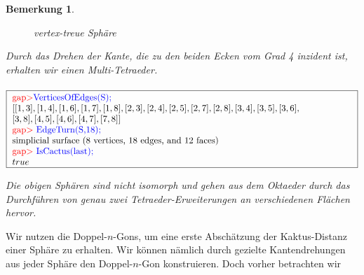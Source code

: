 \documentclass[12pt,titlepage,twoside,cleardoublepage]{article}
\theoremstyle{nummermitklammern}
\newtheorem{bemerkung}[temp]{Bemerkung}
\newtheorem{bemerkung}[zahl]{Bemerkung}
\numberwithin{equation}{section}
\begin{document}
\begin{bemerkung}
\begin{itemize}
\begin{figure}[H]
\begin{center}
\end{center}
\caption{vertex-treue Sphäre}
\end{figure}
Durch das Drehen der Kante, die zu den beiden Ecken vom Grad 4 inzident ist, erhalten wir einen Multi-Tetraeder.\\\\
$\fbox{
\parbox{13.4cm}{
\textcolor{red}{gap$>$}\textcolor{blue}{ VerticesOfEdges(S);}\newline
$[ [ 1, 3 ], [ 1, 4 ], [ 1, 6 ], [ 1, 7 ], [ 1, 8 ], [ 2, 3 ], [ 2, 4 ], [ 2, 5 ], [ 2, 7 ], [ 2, 8 ], [ 3, 4 ], [ 3, 5 ], [ 3, 6 ], \newline
 [ 3, 8 ],
  [ 4, 5 ], [ 4, 6 ], [ 4, 7 ], [ 7, 8 ] ]$\newline
\textcolor{red}{gap$>$} \textcolor{blue}{EdgeTurn(S,18);}\newline
simplicial surface (8 vertices, 18 edges, and 12 faces)\newline
\textcolor{red}{gap$>$} \textcolor{blue}{IsCactus(last);}\newline
$true$
}}$
\end{itemize}
Die obigen Sphären sind nicht isomorph und gehen aus dem Oktaeder durch das Durchführen von genau zwei Tetraeder-Erweiterungen an verschiedenen Flächen hervor.  
\end{bemerkung}
Wir nutzen die Doppel-$n$-Gons, um eine erste Abschätzung der Kaktus-Distanz einer Sphäre zu erhalten. Wir können nämlich durch gezielte Kantendrehungen aus jeder Sphäre den Doppel-$n$-Gon konstruieren. Doch vorher betrachten wir 
\end{document}
